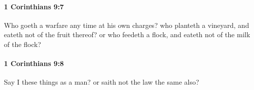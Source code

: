 		\paragraph{1 Corinthians 9:7} %
			\label{1CORINTHIANS-9-7}

			Who goeth a warfare any time at his own charges?  who planteth a vineyard, and eateth not of the fruit thereof?  or who feedeth a flock, and eateth not of the milk of the flock?

			\begin{framed}
			\scriptsize
				\begin{compactdesc}
					\item[SBLG] 
				\end{compactdesc}
			\end{framed}

		\paragraph{1 Corinthians 9:8} %
			\label{1CORINTHIANS-9-8}

			Say I these things as a man?  or saith not the law the same also?

